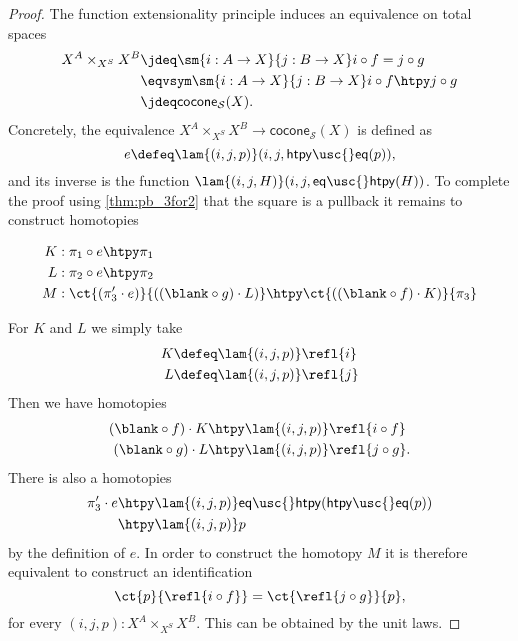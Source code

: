 \begin{proof}
The function extensionality principle induces an equivalence on total spaces
\begin{align*}
X^A\times_{X^S} X^B & \jdeq \sm{i:A\to X}{j:B\to X} i\circ f= j\circ g\\
& \eqvsym \sm{i:A\to X}{j:B\to X} i\circ f\htpy j\circ g \\
& \jdeq \mathsf{cocone}_{\mathcal{S}}(X).
\end{align*}
Concretely, the equivalence $X^A\times_{X^S} X^B \to \mathsf{cocone}_{\mathcal{S}}(X)$ is defined as
\begin{equation*}
e\defeq \lam{(i,j,p)}(i,j,\mathsf{htpy\usc{}eq}(p)),
\end{equation*}
and its inverse is the function $\lam{(i,j,H)}(i,j,\mathsf{eq\usc{}htpy}(H))$.
To complete the proof using \cref{thm:pb_3for2} that the square is a pullback it remains to construct homotopies
\begin{samepage}
\begin{align*}
K & : \pi_1\circ e \htpy \pi_1 \\
L & : \pi_2\circ e \htpy \pi_2 \\
M & : \ct{(\pi_3'\cdot e)}{((\blank\circ g)\cdot L)} \htpy \ct{((\blank\circ f)\cdot K)}{\pi_3}
\end{align*}
\end{samepage}%
For $K$ and $L$ we simply take
\begin{align*}
K & \defeq \lam{(i,j,p)} \refl{i} \\
L & \defeq \lam{(i,j,p)} \refl{j}
\end{align*}
Then we have homotopies 
\begin{align*}
(\blank\circ f)\cdot K & \htpy \lam{(i,j,p)}\refl{i\circ f} \\
(\blank\circ g)\cdot L & \htpy \lam{(i,j,p)}\refl{j\circ g}.
\end{align*}
There is also a homotopies 
\begin{align*}
\pi_3'\cdot e & \htpy \lam{(i,j,p)}\mathsf{eq\usc{}htpy}(\mathsf{htpy\usc{}eq}(p)) \\
& \htpy \lam{(i,j,p)}p
\end{align*}
by the definition of $e$. In order to construct the homotopy $M$ it is therefore equivalent to construct an identification
\begin{equation*}
\ct{p}{\refl{i\circ f}}=\ct{\refl{j\circ g}}{p},
\end{equation*}
for every $(i,j,p):X^A\times_{X^S} X^B$. This can be obtained by the unit laws.
\end{proof}


